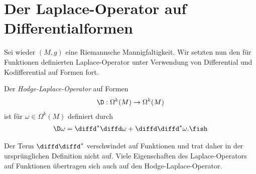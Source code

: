 \documentclass[%
	paper=a5,%
	fleqn,%
	DIV=18,%
	BCOR=0mm,
	fontsize=11pt,
	titlepage=false,%
	bibliography=totoc,
	DIV=18,%
	twoside=true,
	pdftitle=Riemannsche Geometrie,
	pdfauthor=Uwe Semmelmann,
	numbers=noendperiod]%
	{scrbook}
\begin{document}
\section{Der Laplace-Operator auf Differentialformen}

Sei wieder $(M,g)$ eine Riemannsche Mannigfaltigkeit. Wir setzten nun den für Funktionen definierten Laplace-Operator unter Verwendung von Differential und Kodifferential auf Formen fort.

\begin{defn}
Der \emph{Hodge-Laplace-Operator} auf Formen
\begin{align*}
\D : \Omega^k(M)\to \Omega^k(M)
\end{align*}
ist für $\omega\in\Omega^k(M)$ definiert durch
\begin{align*}
\D\omega = \diffd^*\diffd\omega + \diffd\diffd^*\omega.\fish
\end{align*}
\end{defn}

Der Term $\diffd\diffd^*$ verschwindet auf Funktionen und trat daher in der ursprünglichen Definition nicht auf. Viele Eigenschaften des Laplace-Operators auf Funktionen übertragen sich auch auf den Hodge-Laplace-Operator.
\end{document}
